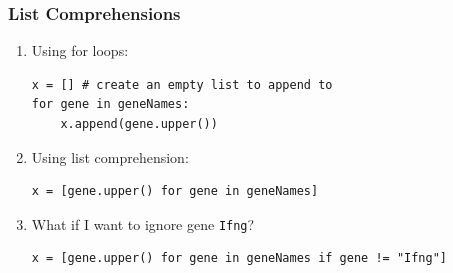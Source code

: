 \documentclass[xcolor=table]{beamer}
\begin{document}
\begin{frame}[fragile]
\frametitle{List Comprehensions}

\begin{enumerate}
\item<1-> Using for loops:
\begin{lstlisting}[style=python]
x = [] # create an empty list to append to
for gene in geneNames:
    x.append(gene.upper())
\end{lstlisting}

\item<2-> Using list comprehension:
\begin{lstlisting}[style=python]
x = [gene.upper() for gene in geneNames]
\end{lstlisting}

\item<3-> What if I want to ignore gene \texttt{Ifng}?
\begin{lstlisting}[style=python]
x = [gene.upper() for gene in geneNames if gene != "Ifng"]
\end{lstlisting}

\end{enumerate}

\end{frame}
\end{document}
